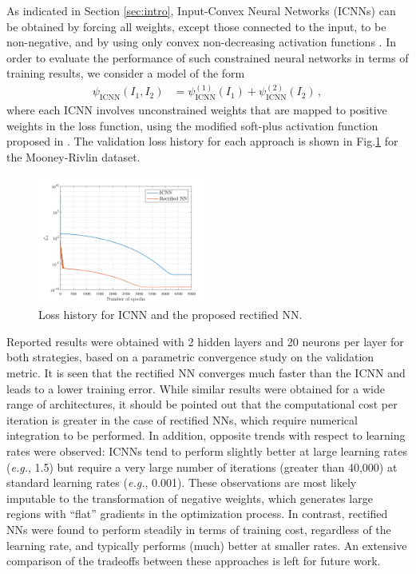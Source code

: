 \begin{remark} As indicated in Section \ref{sec:intro}, Input-Convex Neural Networks (ICNNs) can be obtained by forcing all weights, except those connected to the input, to be non-negative, and by using only convex non-decreasing activation functions \cite{amos2017input, as2022mechanics,Asad-IJNME,KLEIN2022104703}. In order to evaluate the performance of such constrained neural networks in terms of training results, we consider a model of the form 
\begin{align}
    \psi_{\mathrm{ICNN}}(I_1, I_2) &= \psi_{\mathrm{ICNN}}^{(1)}(I_1) + \psi_{\mathrm{ICNN}}^{(2)}(I_2)\,,
\end{align}
where each ICNN involves unconstrained weights that are mapped to positive weights in the loss function, using the modified soft-plus activation function proposed in \cite{as2022mechanics,Asad-IJNME}. The validation loss history for each approach is shown in Fig.\ref{fig:ERR_history} for the Mooney-Rivlin dataset.
\begin{figure}[ht!]
    \begin{center}
        \includegraphics[width = 0.5\textwidth]{Pictures/loss_hist.png}
    \end{center}
    \caption[Loss history for ICNN and the proposed rectified NN.]{Loss history for ICNN and the proposed rectified NN.}
    \label{fig:ERR_history} 
\end{figure}
Reported results were obtained with 2 hidden layers and 20 neurons per layer for both strategies, based on a parametric convergence study on the validation metric. It is seen that the rectified NN converges much faster than the ICNN and leads to a lower training error. While similar results were obtained for a wide range of architectures, it should be pointed out that the computational cost per iteration is greater in the case of rectified NNs, which require numerical integration to be performed. In addition, opposite trends with respect to learning rates were observed: ICNNs tend to perform slightly better at large learning rates (\textit{e.g.}, 1.5) but require a very large number of iterations (greater than 40,000) at standard learning rates (\textit{e.g.}, 0.001). These observations are most likely imputable to the transformation of negative weights, which generates large regions with ``flat'' gradients in the optimization process. In contrast, rectified NNs were found to perform steadily in terms of training cost, regardless of the learning rate, and typically performs (much) better at smaller rates. An extensive comparison of the tradeoffs between these approaches is left for future work.
\end{remark}


